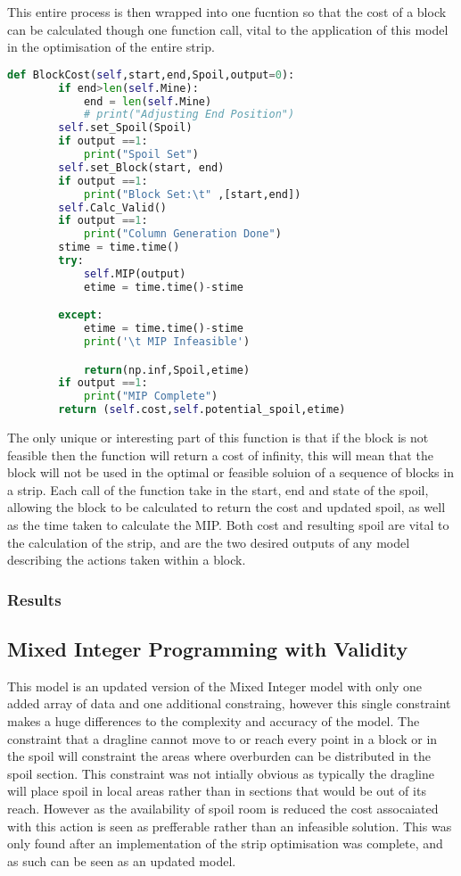 This entire process is then wrapped into one fucntion so that the cost of a block can be calculated though one function call, vital to the application of this model in the optimisation of the entire strip. 
\begin{lstlisting}[language=python]
	def BlockCost(self,start,end,Spoil,output=0):
		if end>len(self.Mine):
			end = len(self.Mine)
			# print("Adjusting End Position")
		self.set_Spoil(Spoil)
		if output ==1:
			print("Spoil Set")
		self.set_Block(start, end)
		if output ==1:
			print("Block Set:\t" ,[start,end])
		self.Calc_Valid()
		if output ==1:
			print("Column Generation Done")
		stime = time.time()
		try:
			self.MIP(output)
			etime = time.time()-stime

		except:
			etime = time.time()-stime
			print('\t MIP Infeasible')

			return(np.inf,Spoil,etime)
		if output ==1:
			print("MIP Complete")
		return (self.cost,self.potential_spoil,etime)
		\end{lstlisting}
The only unique or interesting part of this function is that if the block is not feasible then the function will return a cost of infinity, this will mean that the block will not be used in the optimal or feasible soluion of a sequence of blocks in a strip. Each call of the function take in the start, end and state of the spoil, allowing the block to be calculated to return the cost and updated spoil, as well as the time taken to calculate the MIP. Both cost and resulting spoil are vital to the calculation of the strip, and are the two desired outputs of any model describing the actions taken within a block. 
\subsubsection{Results}
\subsection{Mixed Integer Programming with Validity}
This model is an updated version of the Mixed Integer model with only one added array of data and one additional constraing, however this single constraint makes a huge differences to the complexity and accuracy of the model. The constraint that a dragline cannot move to or reach every point in a block or in the spoil will constraint the areas where overburden can be distributed in the spoil section. This constraint was not intially obvious as typically the dragline will place spoil in local areas rather than in sections that would be out of its reach. However as the availability of spoil room is reduced the cost assocaiated with this action is seen as prefferable rather than an infeasible solution. This was only found after an implementation of the strip optimisation was complete, and as such can be seen as an updated model. 
